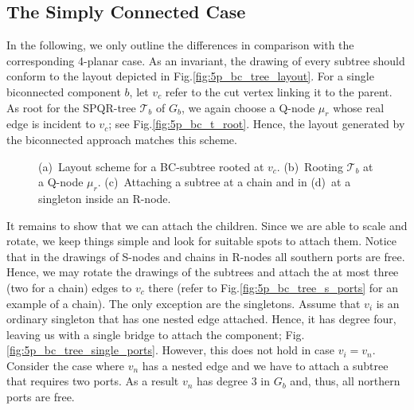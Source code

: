 \documentclass[a4paper,twoside,11pt]{article}
\begin{document}
\subsection{The Simply Connected Case}


In the following, we only outline the differences in comparison with
the corresponding 4-planar case. As an invariant, the drawing of
every subtree should conform to the layout depicted in
Fig.\ref{fig:5p_bc_tree_layout}. For a single biconnected component
$b$, let $v_c$ refer to the cut vertex linking it to the parent. As
root for the SPQR-tree $\mathcal{T}_b$ of $G_b$, we again choose a
Q-node $\mu_r$ whose real edge is incident to $v_c$; see
Fig.\ref{fig:5p_bc_t_root}. Hence, the layout generated by the
biconnected approach matches this scheme.

\begin{figure}[htb]
    \centering
     \begin{minipage}[b]{.24\textwidth}
        \centering
        \subfloat[\label{fig:5p_bc_tree_layout}{}]
        {\texttt{[image: 5p\_bc]}}
    \end{minipage}
     \begin{minipage}[b]{.24\textwidth}
        \centering
        \subfloat[\label{fig:5p_bc_t_root}{}]
        {\texttt{[image: 5p\_bc]}}
    \end{minipage}
     \begin{minipage}[b]{.24\textwidth}
        \centering
        \subfloat[\label{fig:5p_bc_tree_s_ports}{}]
        {\texttt{[image: 5p\_bc]}}
    \end{minipage}
      \begin{minipage}[b]{.24\textwidth}
        \centering
        \subfloat[\label{fig:5p_bc_tree_single_ports}{}]
        {\texttt{[image: 5p\_bc]}}
    \end{minipage}
    \caption{
    (a)~Layout scheme for a BC-subtree rooted at $v_c$.
    (b)~Rooting $\mathcal{T}_b$ at a Q-node $\mu_r$.
    (c)~Attaching a subtree at a chain and in (d)~at a singleton inside an R-node.}
    \label{fig:5p_bc_tree}
\end{figure}

It remains to show that we can attach the children. Since we are
able to scale and rotate, we keep things simple and look for
suitable spots to attach them. Notice that in the drawings of
S-nodes and chains in R-nodes all southern ports are free. Hence, we
may rotate the drawings of the subtrees and attach the at most three
(two for a chain) edges to $v_c$ there (refer to
Fig.\ref{fig:5p_bc_tree_s_ports} for an example of a chain). The
only exception are the singletons. Assume that $v_i$ is an ordinary
singleton that has one nested edge attached. Hence, it has degree
four, leaving us with a single bridge to attach the component;
Fig.\ref{fig:5p_bc_tree_single_ports}. However, this does not hold
in case $v_i = v_n$. Consider the case where $v_n$ has a nested edge
and we have to attach a subtree that requires two ports. As a result
$v_n$ has degree $3$ in $G_b$ and, thus, all northern ports are
free.
\end{document}
